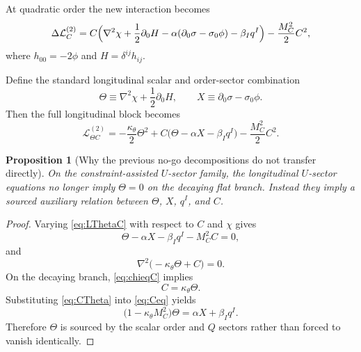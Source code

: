 \documentclass[11pt]{article}
\newtheorem{proposition}{Proposition}
\begin{document}
At quadratic order the new interaction becomes
\begin{equation}
\Delta\mathcal L_C^{(2)}
=
C\Bigl(\nabla^2\chi+\frac{1}{2}\partial_0H-\alpha(\partial_0\sigma-\sigma_0\phi)-\beta_Iq^I\Bigr)
-\frac{M_C^2}{2}C^2,
\label{eq:LC2}
\end{equation}
where \(h_{00}=-2\phi\) and \(H=\delta^{ij}h_{ij}\).

Define the standard longitudinal scalar and order-sector combination
\begin{equation}
\Theta \equiv \nabla^2\chi+\frac{1}{2}\partial_0H,
\qquad
X \equiv \partial_0\sigma-\sigma_0\phi.
\label{eq:ThetaX}
\end{equation}
Then the full longitudinal block becomes
\begin{equation}
\mathcal L_{\Theta C}^{(2)}
=
-\frac{\kappa_\theta}{2}\Theta^2
+C\bigl(\Theta-\alpha X-\beta_Iq^I\bigr)
-\frac{M_C^2}{2}C^2.
\label{eq:LThetaC}
\end{equation}

\begin{proposition}[Why the previous no-go decompositions do not transfer directly]
On the constraint-assisted \(U\)-sector family, the longitudinal \(U\)-sector equations no longer imply \(\Theta=0\) on the decaying flat branch. Instead they imply a sourced auxiliary relation between \(\Theta\), \(X\), \(q^I\), and \(C\).
\end{proposition}

\begin{proof}
Varying \eqref{eq:LThetaC} with respect to \(C\) and \(\chi\) gives
\begin{equation}
\Theta-\alpha X-\beta_Iq^I-M_C^2C=0,
\label{eq:Ceq}
\end{equation}
and
\begin{equation}
\nabla^2\bigl(-\kappa_\theta\Theta+C\bigr)=0.
\label{eq:chieqC}
\end{equation}
On the decaying branch, \eqref{eq:chieqC} implies
\begin{equation}
C=\kappa_\theta\Theta.
\label{eq:CTheta}
\end{equation}
Substituting \eqref{eq:CTheta} into \eqref{eq:Ceq} yields
\begin{equation}
\bigl(1-\kappa_\theta M_C^2\bigr)\Theta
=
\alpha X+\beta_Iq^I.
\label{eq:sourcedTheta}
\end{equation}
Therefore \(\Theta\) is sourced by the scalar order and \(Q\) sectors rather than forced to vanish identically.
\end{proof}
\end{document}
